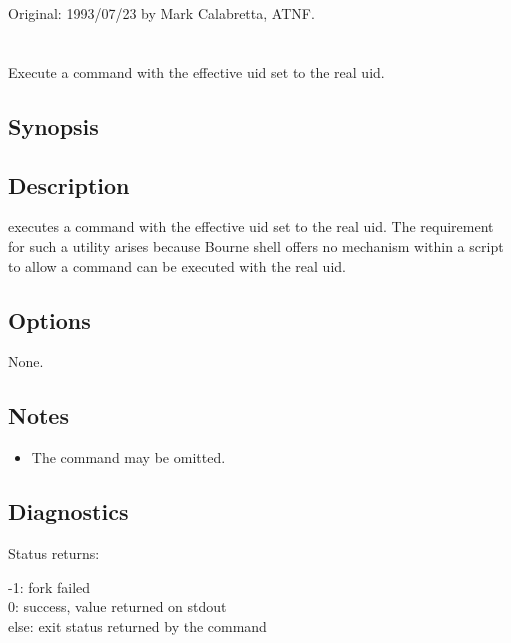 Original: 1993/07/23 by Mark Calabretta, ATNF.

 
\newpage
\section{}
\label{asme}
 
Execute a command with the effective uid set to the real uid.

\subsection*{Synopsis}
 
\begin{synopsis}
\end{synopsis}
 
\subsection*{Description}
 
 executes a command with the effective uid set to the real uid.  The
requirement for such a utility arises because Bourne shell offers no mechanism
within a  script to allow a command can be executed with the real
uid.
 
\subsection*{Options}
 
None.
 
\subsection*{Notes}
 
\begin{itemize}
\item
   The command may be omitted.
\end{itemize}
 
\subsection*{Diagnostics}
 
Status returns:
\begin{status}
  -1:  fork failed\\
   0:  success, value returned on stdout\\
else:  exit status returned by the command
\end{status}
 
